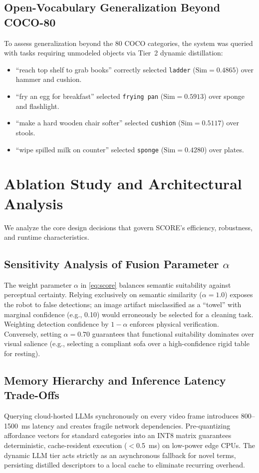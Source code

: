 \documentclass[conference]{IEEEtran}
\begin{document}
\subsection{Open-Vocabulary Generalization Beyond COCO-80}
To assess generalization beyond the 80 COCO categories, the system was queried with tasks requiring unmodeled objects via Tier~2 dynamic distillation:
\begin{itemize}
    \item ``reach top shelf to grab books'' correctly selected \texttt{ladder} ($\text{Sim} = 0.4865$) over hammer and cushion.
    \item ``fry an egg for breakfast'' selected \texttt{frying pan} ($\text{Sim} = 0.5913$) over sponge and flashlight.
    \item ``make a hard wooden chair softer'' selected \texttt{cushion} ($\text{Sim} = 0.5117$) over stools.
    \item ``wipe spilled milk on counter'' selected \texttt{sponge} ($\text{Sim} = 0.4280$) over plates.
\end{itemize}

\section{Ablation Study and Architectural Analysis}
We analyze the core design decisions that govern SCORE's efficiency, robustness, and runtime characteristics.

\subsection{Sensitivity Analysis of Fusion Parameter $\alpha$}
The weight parameter $\alpha$ in \eqref{eq:score} balances semantic suitability against perceptual certainty. Relying exclusively on semantic similarity ($\alpha = 1.0$) exposes the robot to false detections; an image artifact misclassified as a ``towel'' with marginal confidence (e.g., 0.10) would erroneously be selected for a cleaning task. Weighting detection confidence by $1 - \alpha$ enforces physical verification. Conversely, setting $\alpha = 0.70$ guarantees that functional suitability dominates over visual salience (e.g., selecting a compliant sofa over a high-confidence rigid table for resting).

\subsection{Memory Hierarchy and Inference Latency Trade-Offs}
Querying cloud-hosted LLMs synchronously on every video frame introduces 800--1500~ms latency and creates fragile network dependencies. Pre-quantizing affordance vectors for standard categories into an INT8 matrix guarantees deterministic, cache-resident execution ($<$0.5~ms) on low-power edge CPUs. The dynamic LLM tier acts strictly as an asynchronous fallback for novel terms, persisting distilled descriptors to a local cache to eliminate recurring overhead.
\end{document}
